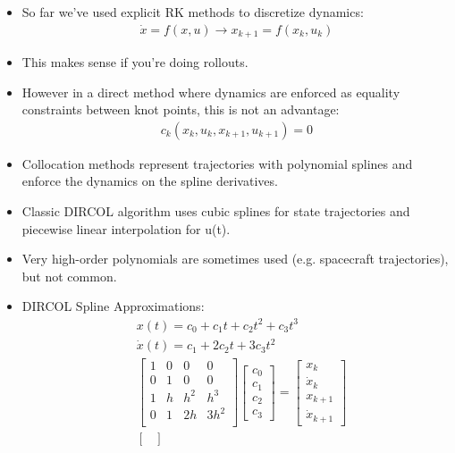 \begin{itemize}
    \item So far we've used explicit RK methods to discretize dynamics:
    \begin{align}
        \dot x = f(x,u) \to x_{k+1} = f(x_k, u_k)
    \end{align}
    \item This makes sense if you're doing rollouts.
    \item However in a direct method where dynamics are enforced as equality constraints between knot points, this is not an advantage:
    \begin{align}
        c_k(x_k, u_k, x_{k+1}, u_{k+1}) = 0
    \end{align}
    \item Collocation methods represent trajectories with polynomial splines and enforce the dynamics on the spline derivatives.
    \item Classic DIRCOL algorithm uses cubic splines for state trajectories and piecewise linear interpolation for u(t).
    \item Very high-order polynomials are sometimes used (e.g. spacecraft trajectories), but not common.
    \item DIRCOL Spline Approximations:
    \begin{align}
        &x(t) = c_0 + c_1t + c_2 t^2 + c_3 t^3 \\
        &\dot x(t) = c_1 + 2 c_2 t + 3 c_3 t^2 \\
        &\begin{bmatrix}
            1 & 0 & 0 & 0 \\
            0 & 1 & 0 & 0 \\
            1 & h & h^2 & h^3 \\
            0 & 1 & 2h & 3h^2 \\
        \end{bmatrix}
        \begin{bmatrix}
            c_0 \\ c_1 \\ c_2 \\ c_3
        \end{bmatrix} = 
        \begin{bmatrix}
            x_k \\ \dot x_k \\ x_{k+1} \\ \dot x_{k+1}
        \end{bmatrix} \\
        &\begin{bmatrix}

\end{bmatrix}
\end{align}
\end{itemize}
